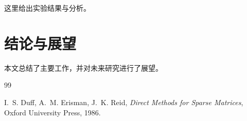 \documentclass[12pt,a4paper]{article}
\begin{document}
这里给出实验结果与分析。

\section{结论与展望}

本文总结了主要工作，并对未来研究进行了展望。

\begin{thebibliography}{99}

I.~S. Duff, A.~M. Erisman, J.~K. Reid,
\textit{Direct Methods for Sparse Matrices},
Oxford University Press, 1986.


\end{thebibliography}
\end{document}
